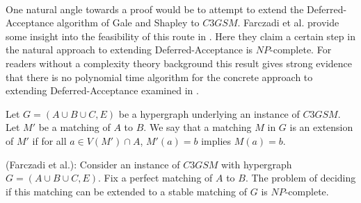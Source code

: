 \paragraph{}
One natural angle towards a proof would be to attempt to extend the Deferred-Acceptance algorithm of Gale and Shapley to $C3GSM$. Farczadi et al. provide some insight into the feasibility of this route in \cite{farczadi2014stable}. Here they claim a certain step in the natural approach to extending Deferred-Acceptance is $NP$-complete. For readers without a complexity theory background this result gives strong evidence that there is no polynomial time algorithm for the concrete approach to extending Deferred-Acceptance examined in \cite{farczadi2014stable}.
\begin{definition}
Let $G = (A\cup B \cup C, E)$ be a hypergraph underlying an instance of $C3GSM$. Let $M'$ be a matching of $A$ to $B$. We say that a matching $M$ in $G$ is an extension of $M'$ if for all $a \in V(M') \cap A$, $M'(a) = b$ implies $M(a) = b$.
\end{definition}
\begin{theorem}
(Farczadi et al.): Consider an instance of $C3GSM$ with hypergraph $G=(A\cup B\cup C, E)$. Fix a perfect matching of $A$ to $B$. The problem of deciding if this matching can be extended to a stable matching of $G$ is $NP$-complete.
\end{theorem}
